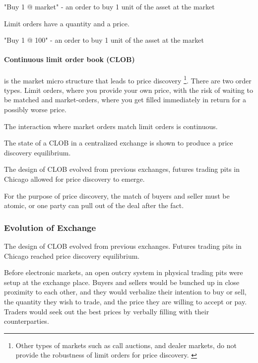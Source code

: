 \documentclass[12pt]{article}
\begin{document}
\begin{enumerate*}
    \item "Buy 1 @ market" - an order to buy 1 unit of the asset at the market  
\end{enumerate*}

Limit orders have a quantity and a price. 

\begin{enumerate*}
    \item "Buy 1 @ 100" - an order to buy 1 unit of the asset at the market  
\end{enumerate*}


\paragraph*{Continuous limit order book (CLOB)}is the market micro structure that leads to price discovery \footnote{Other types of markets such as call auctions, and dealer markets, do not provide the robustness of limit orders for price discovery. \cite{RePEc:hal:journl:hal-00459785}}. There are two order types. Limit orders, where you provide your own price, with the risk of waiting to be matched and market-orders, where you get filled immediately in return for a possibly worse price.

The interaction where market orders match limit orders is continuous. 

The state of a CLOB in a centralized exchange is shown to produce a price discovery equilibrium. 

The design of CLOB evolved from previous exchanges, futures trading pits in Chicago allowed for price discovery to emerge. 

For the purpose of price discovery, the match of buyers and seller must be atomic, or one party can pull out of the deal after the fact. 


\subsubsection*{Evolution of Exchange}
The design of CLOB evolved from previous exchanges. Futures trading pits in Chicago reached price discovery equilibrium.  

Before electronic markets, an open outcry system in physical trading pits were setup at the exchange place. Buyers and sellers would be bunched up in close proximity to each other, and they would verbalize their intention to buy or sell, the quantity they wish to trade, and the price they are willing to accept or pay. Traders would seek out the best prices by verbally filling with their counterparties. 
\end{document}
